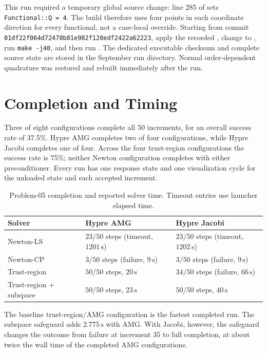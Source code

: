 \documentclass[11pt]{article}
\begin{document}
This run required a temporary global source change: line 285 of
 sets
\texttt{Functional::Q = 4}.  The build therefore uses four points in each
coordinate direction for every functional, not a case-local override. Starting
from commit \texttt{01df22f064d72470b81e982f120edf2422a62223}, apply the recorded
, change to
, run
\texttt{make -j40}, and then run
. The dedicated executable
checksum and complete source state are stored in the September run directory.
Normal order-dependent quadrature was restored and rebuilt immediately after
the run.

\section*{Completion and Timing}

Three of eight configurations complete all 50 increments, for an overall success
rate of 37.5\%.  Hypre AMG completes two of four configurations, while Hypre Jacobi
completes one of four.  Across the four trust-region configurations the success
rate is 75\%; neither Newton configuration completes with either preconditioner.
Every run has one response state and one visualization cycle for the unloaded state
and each accepted increment.

\begin{table}[h]
  \centering
  \small
  \caption{Problem-05 completion and reported solver time.  Timeout entries use launcher elapsed time.}
  \begin{tabular}{@{}lll@{}}
    \toprule
    Solver & Hypre AMG & Hypre Jacobi \\
    \midrule
    Newton-LS & $23/50$ steps (timeout, $1201\,\mathrm{s}$) & $23/50$ steps (timeout, $1202\,\mathrm{s}$) \\
    Newton-CP & $3/50$ steps (failure, $9\,\mathrm{s}$) & $3/50$ steps (failure, $9\,\mathrm{s}$) \\
    Trust-region & $50/50$ steps, $20\,\mathrm{s}$ & $34/50$ steps (failure, $66\,\mathrm{s}$) \\
    Trust-region + subspace & $50/50$ steps, $23\,\mathrm{s}$ & $50/50$ steps, $40\,\mathrm{s}$ \\
    \bottomrule
  \end{tabular}
\end{table}

The baseline trust-region/AMG configuration is the fastest completed run.  The
subspace safeguard adds $2.775\,\mathrm{s}$ with AMG.  With Jacobi, however,
the safeguard changes the outcome from failure at increment 35 to full completion,
at about twice the wall time of the completed AMG configurations.
\end{document}
